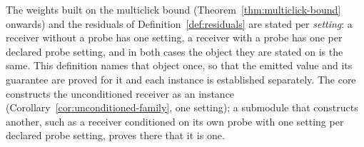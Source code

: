 
The weights built on the multiclick bound
(Theorem~\ref{thm:multiclick-bound} onwards) and the residuals of
Definition~\ref{def:residuals} are stated per \emph{setting}: a receiver
without a probe has one setting, a receiver with a probe has one per declared
probe setting, and in both cases the object they are stated on is the same. This definition names that object once, so that the emitted value and
its guarantee are proved for it and each instance is established separately.
The core constructs the unconditioned receiver as an instance
(Corollary~\ref{cor:unconditioned-family}, one setting); a submodule that
constructs another, such as a receiver conditioned on its own probe with one
setting per declared probe setting, proves there that it is one.

